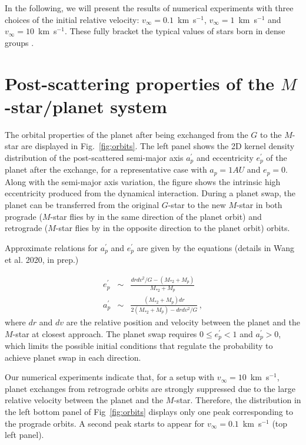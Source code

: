 \documentclass[twocolumn]{aastex62}
\begin{document}
In the following, we will present the results
of numerical experiments with three choices of the initial relative velocity: $v_\infty =0.1$~km~s$^{-1}$,
$v_\infty =1$~km~s$^{-1}$
and $v_\infty =10$~km~s$^{-1}$.
These fully bracket the typical values
of stars born in dense groups \citep{Binney1987,Adams2001}.




\section{Post-scattering properties of the $M$-star/planet system}

The orbital properties of the planet after being exchanged from the $G$ to the $M$-star are displayed in Fig.~\ref{fig:orbits}. The left panel shows the 2D kernel density distribution of the post-scattered semi-major axis $a_p^\prime$ and eccentricity $e_p^\prime$ of the  planet after the exchange, for a representative case with $a_p=1AU$ and $e_p=0$. 
Along with the semi-major axis variation, 
the figure shows the
intrinsic high eccentricity produced from the dynamical interaction. During a planet swap, the planet can be transferred from the original $G$-star to the new $M$-star in both prograde ($M$-star flies by in the same direction of the planet orbit) and retrograde ($M$-star flies by in the opposite direction to the planet orbit) orbits. 

{ Approximate relations for $a_p^\prime$ and $e_p^\prime$ are given by the equations (details in Wang et al. 2020, in prep.) 

\begin{eqnarray}\label{eq:swap}
e_p^\prime &\sim& \frac{drdv^2/G-(M_{*2}+M_p)}{M_{*2}+M_p}\\
a_p^\prime &\sim& \frac{(M_{*2}+M_p)dr}{2(M_{*2}+M_p)-drdv^2/G}\,,
\end{eqnarray}
where  $dr$ and $dv$ are the relative position and velocity between the planet and the $M$-star at closest approach. The planet swap requires $0 \le e_p^\prime < 1$ and $a_p^\prime >0$, which limits the possible initial conditions that regulate the probability to achieve planet swap in each direction.} Our numerical experiments indicate that, for a setup with  $v_\infty=10$~km~s$^{-1}$, planet exchanges from retrograde orbits are strongly suppressed due to the large relative velocity between the planet and the $M$-star. Therefore, the distribution in the left bottom panel of Fig~\ref{fig:orbits} displays only one peak corresponding to the prograde orbits. A second peak starts to appear for $v_\infty=0.1$~km~s$^{-1}$ (top left panel).
\end{document}
